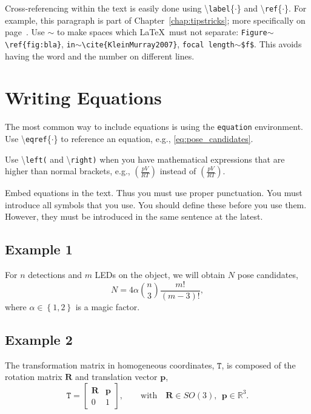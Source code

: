 Cross-referencing within the text is easily done using \textbackslash\texttt{label}\{$\cdot$\} and \textbackslash\texttt{ref}\{$\cdot$\}.
For example, this paragraph is part of Chapter~\ref{chap:tipstricks}; more specifically on page~\pageref{sec:references}.
Use $\sim$ to make spaces which \LaTeX\ must not separate: \texttt{Figure$\sim$\textbackslash ref\{fig:bla\}}, \texttt{in$\sim$\textbackslash cite\{KleinMurray2007\}}, \texttt{focal length$\sim$\$f\$}.
This avoids having the word and the number on different lines.

\section{Writing Equations}\label{sec:math}

The most common way to include equations is using the \texttt{equation} environment.
Use \textbackslash\texttt{eqref}\{$\cdot$\} to reference an equation, e.g., \eqref{eq:pose_candidates}.

Use \textbackslash\texttt{left(} and \textbackslash\texttt{right)} when you have mathematical expressions that are higher than normal brackets, e.g., $\left(\frac{pV}{RT}\right)$ instead of $(\frac{pV}{RT})$.

Embed equations in the text.
Thus you must use proper punctuation.
You must introduce all symbols that you use.
You should define these before you use them.
However, they must be introduced in the same sentence at the latest. 

\subsection*{Example 1}

For $n$ detections and $m$ LEDs on the object, we will
obtain $N$ pose candidates,
	\begin{equation}\label{eq:pose_candidates}
		N =  4 \alpha \binom{n}{3} \frac{m!}{(m-3)!},
	\end{equation}
where $\alpha \in \left\{ {1, 2}\right\}$ is a magic factor.

\subsection*{Example 2}

The transformation matrix in homogeneous coordinates, $\mathtt{T}$, is composed of the rotation matrix $\mathbf{R}$ and translation vector $\mathbf{p}$,
  \begin{equation}\label{eq:se3}
    \mathtt{T} = \begin{bmatrix}\mathbf{R} & \mathbf{p} \\ 0 & 1\end{bmatrix}, \qquad \text{with} \quad \mathbf{R} \in SO(3), \ \ \mathbf{p} \in \mathbb{R}^3.
  \end{equation}



